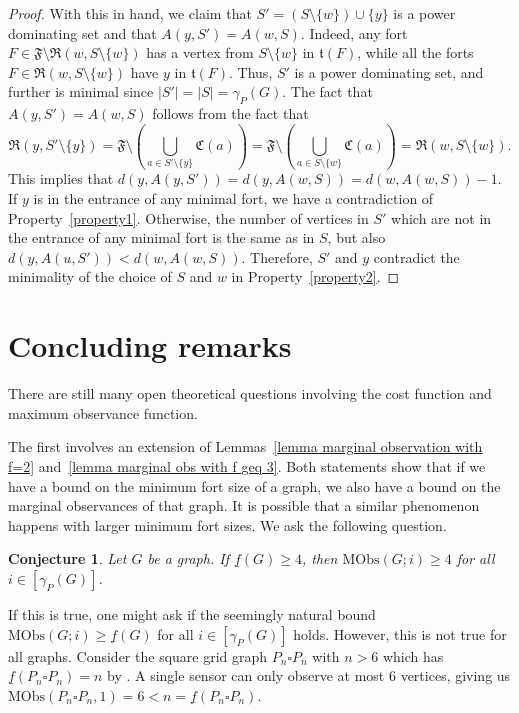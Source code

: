 \documentclass{article}
\newtheorem{conjecture}[theorem]{Conjecture}
\begin{document}
\begin{proof}
            With this in hand, we claim that $S'=(S\setminus \{w\})\cup \{y\}$ is a power dominating set and that $A(y,S')=A(w,S)$.
            Indeed, any fort $F\in \mathfrak{F}\setminus\mathfrak{R}(w,S\setminus \{w\})$ has a vertex from $S\setminus \{w\}$ in $\mathfrak{t}(F)$, while all the forts $F\in\mathfrak{R}(w,S\setminus \{w\})$ have $y$ in $\mathfrak{t}(F)$.
            Thus, $S'$ is a power dominating set, and further is minimal since $|S'|=|S|=\gamma_P(G)$.
            The fact that $A(y,S')=A(w,S)$ follows from the fact that 
                \[ \mathfrak{R}(y,S'\setminus \{y\})=\mathfrak{F}\setminus \left(\bigcup_{a\in S'\setminus \{y\}}\mathfrak{C}(a)\right)=\mathfrak{F}\setminus \left(\bigcup_{a\in S\setminus \{w\}}\mathfrak{C}(a)\right)=\mathfrak{R}(w,S\setminus \{w\}). \]
            This implies that $d(y,A(y,S'))=d(y,A(w,S))=d(w,A(w,S))-1$. 
            If $y$ is in the entrance of any minimal fort, we have a contradiction of Property~\ref{property1}. 
            Otherwise, the number of vertices in $S'$ which are not in the entrance of any minimal fort is the same as in $S$, but also $d(y,A(u,S')) < d(w,A(w,S))$. 
            Therefore, $S'$ and $y$ contradict the minimality of the choice of $S$ and $w$ in Property~\ref{property2}.
        \end{proof}

\section{Concluding remarks}\label{section concluding remarks}
    There are still many open theoretical questions involving the cost function and maximum observance function.
    
    The first involves an extension of Lemmas~\ref{lemma marginal observation with f=2} and~\ref{lemma marginal obs with f geq 3}.
    Both statements show that if we have a bound on the minimum fort size of a graph, we also have a bound on the marginal observances of that graph.
    It is possible that a similar phenomenon happens with larger minimum fort sizes. We ask the following question.
    \begin{conjecture}
        Let $G$ be a graph. If $\underline{f}(G)\geq 4$, then
    	   $ \mathrm{MObs}(G;i)\geq 4 $
        for all $i\in [\gamma_P(G)]$.
    \end{conjecture}
    
    If this is true, one might ask if the seemingly natural bound $\mathrm{MObs}(G;i)\geq \underline{f}(G)$ for all $i\in [\gamma_P(G)]$ holds.
    However, this is not true for all graphs.
    Consider the square grid graph $P_n\square P_n$ with $n>6$ which has $\underline{f}(P_n\square P_n)=n$ by \cite[Theorem 9]{LLC2025}.
    A single sensor can only observe at most $6$ vertices, giving us $\mathrm{MObs}(P_n\square P_n,1)=6< n= \underline{f}(P_n\square P_n)$.
    
\end{document}
